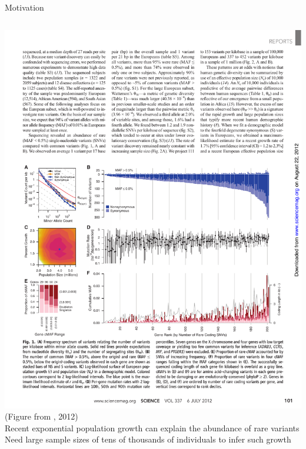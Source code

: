 \documentclass[final,hyperref={pdfpagelabels=false},professionalfonts,mathserif]{beamer}
\begin{document}
\begin{frame}[fragile]
\begin{columns}[t]
\begin{column}{.495\linewidth}
\begin{block}{\large Motivation}
\begin{columns}[T]
\begin{column}{.97\linewidth}
{				\includegraphics[width=14in]{figs/Nelson_variants_by_frequency} \\
				}
				(Figure from \citeauthor{nelson:2012}, 2012) \\
				Recent exponential population growth can explain the abundance of rare variants \\%
				Need large sample sizes of tens of thousands of individuals to infer such growth
			\end{column}
			\end{columns}
		\end{block}


\end{column}
\end{columns}
\end{frame}
\end{document}
